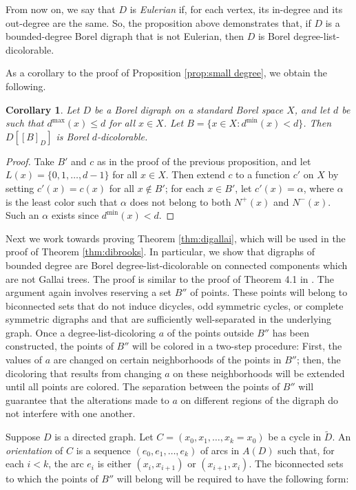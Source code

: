 \documentclass[psamsfonts]{amsart}
\newtheorem{cor}[thm]{Corollary}
\theoremstyle{definition}
\theoremstyle{remark}
\numberwithin{equation}{section}
\begin{document}
From now on, we say that $D$ is {\it Eulerian} if, for each vertex, its in-degree and its out-degree are the same. So, the proposition above demonstrates that, if $D$ is a bounded-degree Borel digraph that is not Eulerian, then $D$ is Borel degree-list-dicolorable.

As a corollary to the proof of Proposition \ref{prop:small degree}, we obtain the following.

\begin{cor}
\label{cor:small degree dibrooks}
    Let $D$ be a Borel digraph on a standard Borel space $X$, and let $d$ be such that $d^{\max}(x) \leq d$ for all $x \in X$. Let $B = \{x \in X : d^{\min}(x) < d \}$. Then $D[[B]_D]$ is Borel $d$-dicolorable.
\end{cor}

\begin{proof}
    Take $B'$ and $c$ as in the proof of the previous proposition, and let $L(x) = \{0, 1, \dots, d - 1\}$ for all $x \in X$. Then extend $c$ to a function $c'$ on $X$ by setting $c'(x) = c(x)$ for all $x \notin B'$; for each $x \in B'$, let $c'(x) = \alpha$, where $\alpha$ is the least color such that $\alpha$ does not belong to both $N^+(x)$ and $N^-(x)$. Such an $\alpha$ exists since $d^{\min}(x) < d$.
\end{proof}

Next we work towards proving Theorem \ref{thm:digallai}, which will be used in the proof of Theorem \ref{thm:dibrooks}. In particular, we show that digraphs of bounded degree are Borel degree-list-dicolorable on connected components which are not Gallai trees. The proof is similar to the proof of Theorem 4.1 in \cite{cmt2016}. The argument again involves reserving a set $B''$ of points. These points will belong to biconnected sets that do not induce dicycles, odd symmetric cycles, or complete symmetric digraphs and that are sufficiently well-separated in the underlying graph. Once a degree-list-dicoloring $a$ of the points outside $B''$ has been constructed, the points of $B''$ will be colored in a two-step procedure: First, the values of $a$ are changed on certain neighborhoods of the points in $B''$; then, the dicoloring that results from changing $a$ on these neighborhoods will be extended until all points are colored. The separation between the points of $B''$ will guarantee that the alterations made to $a$ on different regions of the digraph do not interfere with one another.

Suppose $D$ is a directed graph. Let $C = (x_0, x_1, \dots, x_k = x_0)$ be a cycle in $\tilde{D}$. An \emph{orientation} of $C$ is a sequence $(e_0, e_1, \dots, e_k)$ of arcs in $A(D)$ such that, for each $i < k$, the arc $e_i$ is either $(x_i, x_{i + 1})$ or $(x_{i + 1}, x_i)$. The biconnected sets to which the points of $B''$ will belong will be required to have the following form:
\end{document}
